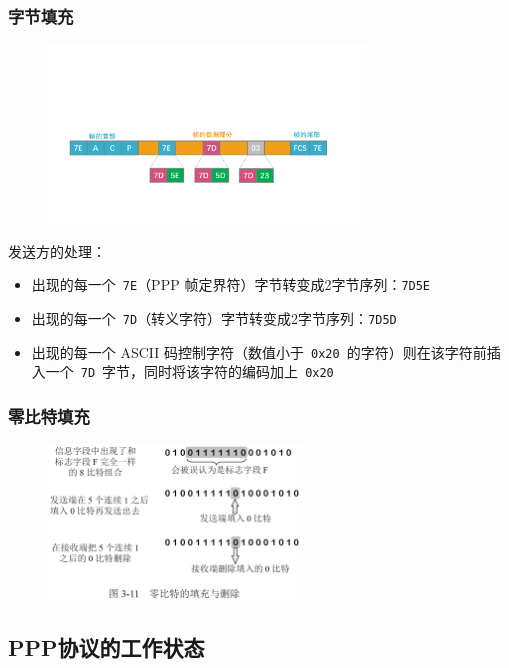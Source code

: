 \documentclass[cs4size,a4paper,10pt]{ctexart}
\begin{document}
	\subsubsection{字节填充}
	\begin{figure}[H]
		\centering
		\includegraphics[width=0.75\textwidth]{img/3.3.2.2}
	\end{figure}

	发送方的处理：
	\begin{itemize}
		\item 出现的每一个\ \verb|7E|（PPP 帧定界符）字节转变成2字节序列：\verb|7D5E|
		\item 出现的每一个\ \verb|7D|（转义字符）字节转变成2字节序列：\verb|7D5D|
		\item 出现的每一个 ASCII 码控制字符（数值小于\ \verb|0x20|\ 的字符）则在该字符前插入一个\ \verb|7D|\ 字节，同时将该字符的编码加上\ \verb|0x20|
	\end{itemize}

	\subsubsection{零比特填充}

	\begin{figure}[H]
		\centering
		\includegraphics[width=0.6\textwidth]{img/3.11}
	\end{figure}

	\subsection{PPP协议的工作状态}
\end{document}
